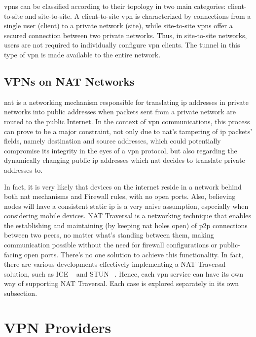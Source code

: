 \documentclass[11pt,twoside,a4paper]{report}
\begin{document}
\ac{vpn}s can be classified according to their topology in two main categories: client-to-site and site-to-site. A client-to-site \ac{vpn} is characterized by connections from a single user (client) to a private network (site), while site-to-site \ac{vpn}s offer a secured connection between two private networks. Thus, in site-to-site networks, users are not required to individually configure \ac{vpn} clients. The tunnel in this type of \ac{vpn} is made available to the entire network.

\subsection{VPNs on NAT Networks}

\ac{nat} is a networking mechanism responsible for translating \ac{ip} addresses in private networks into public addresses when packets sent from a private network are routed to the public Internet. In the context of \ac{vpn} communications, this process can prove to be a major constraint, not only due to \ac{nat}'s tampering of \ac{ip} packets' fields, namely destination and source addresses, which could potentially compromise its integrity in the eyes of a \ac{vpn} protocol, but also regarding the dynamically changing public \ac{ip} addresses which \ac{nat} decides to translate private addresses to.

In fact, it is very likely that devices on the internet reside in a network behind both \ac{nat} mechanisms and Firewall rules, with no open ports. Also, believing nodes will have a consistent static \ac{ip} is a very naive assumption, especially when considering mobile devices. NAT Traversal is a networking technique that enables the establishing and maintaining (by keeping \ac{nat} holes open) of \ac{p2p} connections between two peers, no matter what's standing between them, making communication possible without the need for firewall configurations or public-facing open ports. There's no one solution to achieve this functionality. In fact, there are various developments effectively implementing a NAT Traversal solution, such as ICE ~\cite{rfc8445} and STUN ~\cite{rfc8489}. Hence, each \ac{vpn} service can have its own way of supporting NAT Traversal. Each case is explored separately in its own subsection.


\section{VPN Providers}
\end{document}

